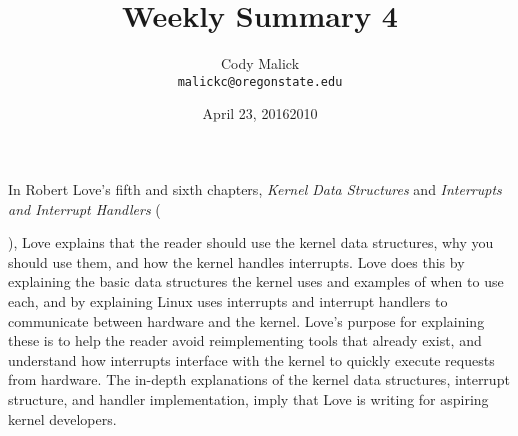 \documentclass[10pt,letterpaper]{article}
\begin{document}
  \title{Weekly Summary 4}
  \author{Cody Malick\\
  \texttt{malickc@oregonstate.edu}}
  \date{April 23, 2016}
  \maketitle

    In Robert Love's fifth and sixth chapters, \textit{Kernel Data Structures}
    and \textit{Interrupts and Interrupt Handlers} (\date{2010}), Love explains
    that the reader should use the kernel data structures, why you should use
    them, and how the kernel handles interrupts.
    Love does this by explaining the basic data structures the kernel uses and
    examples of when to use each, and by explaining Linux uses interrupts
    and interrupt handlers to communicate between hardware and the kernel.
    Love's purpose for explaining these is to help the reader avoid reimplementing
    tools that already exist, and understand how interrupts interface with the
    kernel to quickly execute requests from hardware.
    The in-depth explanations of the kernel data structures, interrupt structure,
    and handler implementation, imply that Love is writing for aspiring kernel
    developers.
\end{document}
